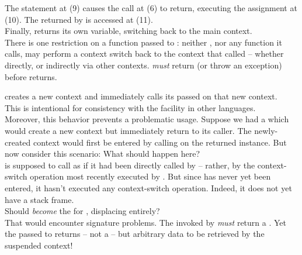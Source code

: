 The  statement at (9) causes the \resume call at (6) to return,
executing the assignment at (10). The  returned by  is
accessed at (11).\\

Finally,  returns its own  variable, switching back to the main
context.\\

There is one restriction on a function  passed to \resumewith:
neither , nor any function it calls, may perform a context switch
back to the context that called \resumewith -- whether directly, or indirectly
via other contexts.  \emph{must} return (or throw an exception)
before \resumewith returns.



\callcc creates a new context and immediately calls its passed \entryfn on
that new context.\\

This is intentional for consistency with the \cc facility in other
languages.\cite{schemecallcc}\citecomma\cite{rubycallcc}\\

Moreover, this behavior prevents a problematic usage. Suppose we had a
 which would create a new context but immediately
return to its caller. The newly-created context would first be entered by
calling \resume on the returned \cont instance.
But now consider this scenario:
What should happen here?\\

\resumewith is supposed to call  as if it had been
directly called by  -- rather, by the context-switch
operation most recently executed by . But
since  has never yet been entered, it hasn't executed
any context-switch operation. Indeed, it does not yet have a stack frame.\\

Should  \emph{become} the \entryfn
for , displacing  entirely?\\

That would encounter signature problems. The \entryfn invoked by \callcc
\emph{must} return a \cont. Yet the  passed to \resumewith returns --
not a \cont -- but arbitrary data to be retrieved by the suspended context!\\

